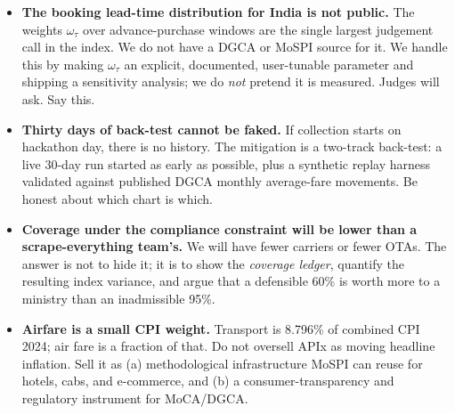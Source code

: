 \begin{warnbox}
\begin{itemize}
\item \textbf{The booking lead-time distribution for India is not public.} The weights
$\omega_\tau$ over advance-purchase windows are the single largest judgement call in the
index. We do not have a DGCA or MoSPI source for it. We handle this by making
$\omega_\tau$ an explicit, documented, user-tunable parameter and shipping a sensitivity
analysis; we do \emph{not} pretend it is measured. Judges will ask. Say this.
\item \textbf{Thirty days of back-test cannot be faked.} If collection starts on hackathon
day, there is no history. The mitigation is a two-track back-test: a live 30-day run
started as early as possible, plus a synthetic replay harness validated against published
DGCA monthly average-fare movements. Be honest about which chart is which.
\item \textbf{Coverage under the compliance constraint will be lower than a
scrape-everything team's.} We will have fewer carriers or fewer OTAs. The answer is not to
hide it; it is to show the \emph{coverage ledger}, quantify the resulting index variance,
and argue that a defensible 60\% is worth more to a ministry than an inadmissible 95\%.
\item \textbf{Airfare is a small CPI weight.} Transport is 8.796\% of combined CPI 2024;
air fare is a fraction of that. Do not oversell APIx as moving headline inflation. Sell it
as (a) methodological infrastructure MoSPI can reuse for hotels, cabs, and e-commerce, and
(b) a consumer-transparency and regulatory instrument for MoCA/DGCA.
\end{itemize}
\end{warnbox}
